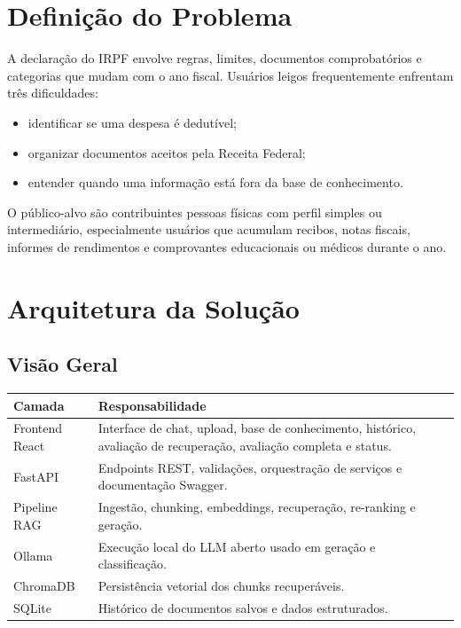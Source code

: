 \documentclass[11pt,a4paper,oneside]{article}
\begin{document}
\section{Definição do Problema}

A declaração do IRPF envolve regras, limites, documentos comprobatórios e categorias que mudam com o ano fiscal. Usuários leigos frequentemente enfrentam três dificuldades:

\begin{itemize}[leftmargin=7mm]
  \item identificar se uma despesa é dedutível;
  \item organizar documentos aceitos pela Receita Federal;
  \item entender quando uma informação está fora da base de conhecimento.
\end{itemize}

O público-alvo são contribuintes pessoas físicas com perfil simples ou intermediário, especialmente usuários que acumulam recibos, notas fiscais, informes de rendimentos e comprovantes educacionais ou médicos durante o ano.

\section{Arquitetura da Solução}

\subsection{Visão Geral}

\begin{center}
\begin{tabularx}{\textwidth}{@{}L{38mm}Y@{}}
\toprule
\textbf{Camada} & \textbf{Responsabilidade} \\
\midrule
Frontend React & Interface de chat, upload, base de conhecimento, histórico, avaliação de recuperação, avaliação completa e status. \\
FastAPI & Endpoints REST, validações, orquestração de serviços e documentação Swagger. \\
Pipeline RAG & Ingestão, chunking, embeddings, recuperação, re-ranking e geração. \\
Ollama & Execução local do LLM aberto usado em geração e classificação. \\
ChromaDB & Persistência vetorial dos chunks recuperáveis. \\
SQLite & Histórico de documentos salvos e dados estruturados. \\
\bottomrule
\end{tabularx}
\end{center}
\end{document}
